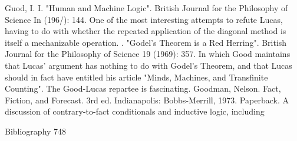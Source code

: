 Guod, I. I. "Human and Machine Logic". British Journal for the Philosophy of Science In
  (196/): 144. One of the most interesting attempts to refute Lucas, having to do with
  whether the repeated application of the diagonal method is itself a mechanizable
  operation.
. "Godel's Theorem is a Red Herring". British Journal for the Philosophy of Science 19
  (1969): 357. In which Good maintains that Lucas' argument has nothing to do with
  Godel's Theorem, and that Lucas should in fact have entitled his article "Minds,
  Machines, and Transfinite Counting". The Good-Lucas repartee is fascinating.
Goodman, Nelson. Fact, Fiction, and Forecast. 3rd ed. Indianapolis: Bobbs-Merrill, 1973.
  Paperback. A discussion of contrary-to-fact conditionals and inductive logic, including

Bibliography                                                                             748

